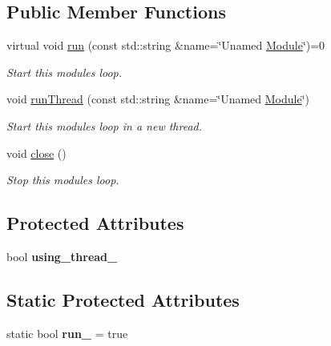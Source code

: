\subsection*{Public Member Functions}
\begin{DoxyCompactItemize}
\item 
virtual void \hyperlink{classTarbora_1_1AbstractModule_acfb70b92b109b5e8ceae997c8629180a}{run} (const std\+::string \&name=\char`\"{}Unamed \hyperlink{classTarbora_1_1Module}{Module}\char`\"{})=0
\begin{DoxyCompactList}\small\item\em Start this module\textquotesingle{}s loop. \end{DoxyCompactList}\item 
void \hyperlink{classTarbora_1_1AbstractModule_ae65c482cc7cca2aae3e24811880c6313}{run\+Thread} (const std\+::string \&name=\char`\"{}Unamed \hyperlink{classTarbora_1_1Module}{Module}\char`\"{})
\begin{DoxyCompactList}\small\item\em Start this module\textquotesingle{}s loop in a new thread. \end{DoxyCompactList}\item 
\mbox{\label{classTarbora_1_1AbstractModule_a3b1cc88ec4fc5c1351e5f4abe0e25948}} 
void \hyperlink{classTarbora_1_1AbstractModule_a3b1cc88ec4fc5c1351e5f4abe0e25948}{close} ()
\begin{DoxyCompactList}\small\item\em Stop this module\textquotesingle{}s loop. \end{DoxyCompactList}\end{DoxyCompactItemize}
\subsection*{Protected Attributes}
\begin{DoxyCompactItemize}
\item 
\mbox{\label{classTarbora_1_1AbstractModule_aa13dfaed16573bef7cce22a473616bd5}} 
bool {\bfseries using\+\_\+thread\+\_\+}
\end{DoxyCompactItemize}
\subsection*{Static Protected Attributes}
\begin{DoxyCompactItemize}
\item 
\mbox{\label{classTarbora_1_1AbstractModule_a66ab779015a191a3188b1f91925e592b}} 
static bool {\bfseries run\+\_\+} = true
\end{DoxyCompactItemize}


